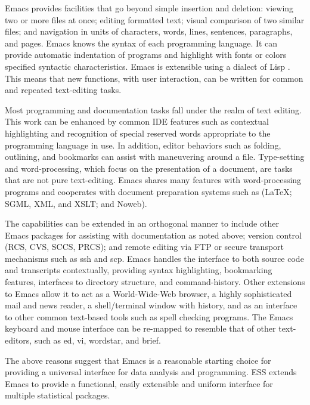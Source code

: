 \documentclass{article}
\begin{document}
Emacs provides facilities that go beyond simple insertion and
deletion: viewing two or more files at once; editing formatted text;
visual comparison of two similar files; and navigation in units of
characters, words, lines, sentences, paragraphs, and pages.  Emacs
knows the syntax of each programming language.  It can provide
automatic indentation of programs and highlight with fonts or colors
specified syntactic characteristics.  Emacs is extensible using a
dialect of Lisp \citep{RChassell1999,PGraham:1996}.  This means that
new functions, with user interaction, can be written for common and
repeated text-editing tasks.

Most programming and documentation tasks fall under the realm of text
editing.  This work can be enhanced by common IDE features such as
contextual highlighting and recognition of special reserved words
appropriate to the programming language in use.  In addition, editor
behaviors such as folding, outlining, and bookmarks can assist with
maneuvering around a file.  Type-setting and word-processing, which
focus on the presentation of a document, are tasks that are not pure
text-editing.  Emacs shares many features with word-processing
programs and cooperates with document preparation systems such as
(\LaTeX; SGML, XML, and XSLT; and Noweb).

The capabilities can be extended in an orthogonal manner to include
other Emacs packages for assisting with documentation as noted above;
version control (RCS, CVS, SCCS, PRCS); and remote editing via FTP or
secure transport mechanisms such as ssh and scp.  Emacs handles the
interface to both source code and transcripts contextually, providing
syntax highlighting, bookmarking features, interfaces to directory
structure, and command-history.  Other extensions to Emacs allow it to
act as a World-Wide-Web browser, a highly sophisticated mail and news
reader, a shell/terminal window with history, and as an interface to
other common text-based tools such as spell checking programs.  The
Emacs keyboard and mouse interface can be re-mapped to resemble that
of other text-editors, such as ed, vi, wordstar, and brief.

The above reasons suggest that Emacs is a reasonable starting choice
for providing a universal interface for data analysis and programming.
ESS extends Emacs to provide a functional, easily extensible and
uniform interface for multiple statistical packages.
\end{document}
